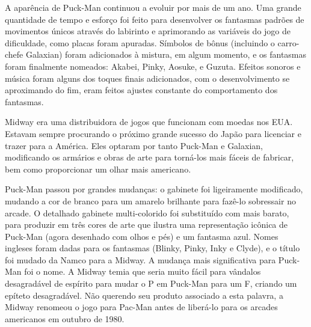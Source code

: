 A aparência de Puck-Man continuou a evoluir por mais de um ano. Uma grande quantidade de tempo e esforço foi feito para desenvolver os fantasmas padrões de movimentos únicos através do labirinto e aprimorando as variáveis ​​do jogo de dificuldade, como placas foram apuradas. Símbolos de bônus (incluindo o carro-chefe Galaxian) foram adicionados à mistura, em algum momento, e os fantasmas foram finalmente nomeados: Akabei, Pinky, Aosuke, e Guzuta. Efeitos sonoros e música foram alguns dos toques finais adicionados, com o desenvolvimento se aproximando do fim, eram feitos ajustes constante do comportamento dos fantasmas.

Midway era uma distribuidora de jogos que funcionam com moedas nos EUA. Estavam sempre procurando o próximo grande sucesso do Japão para licenciar e trazer para a América. Eles optaram por tanto Puck-Man e Galaxian, modificando os armários e obras de arte para torná-los mais fáceis de fabricar, bem como proporcionar um olhar mais americano.

Puck-Man passou por grandes mudanças: o gabinete foi ligeiramente modificado, mudando a cor de branco para um amarelo brilhante para fazê-lo sobressair no arcade. O detalhado gabinete multi-colorido foi substituído com mais barato, para produzir em três cores de arte que ilustra uma representação icônica de Puck-Man (agora desenhado com olhos e pés) e um fantasma azul. Nomes ingleses foram dadas para os fantasmas (Blinky, Pinky, Inky e Clyde), e o título foi mudado da Namco para  a Midway. A mudança mais significativa para Puck-Man foi o nome. A Midway temia que seria muito fácil para vândalos desagradável de espírito para mudar o P em Puck-Man para um F, criando um epíteto desagradável. Não querendo seu produto associado a esta palavra, a Midway renomeou o jogo para Pac-Man antes de liberá-lo para os arcades americanos em outubro de 1980.\cite{dossier}

